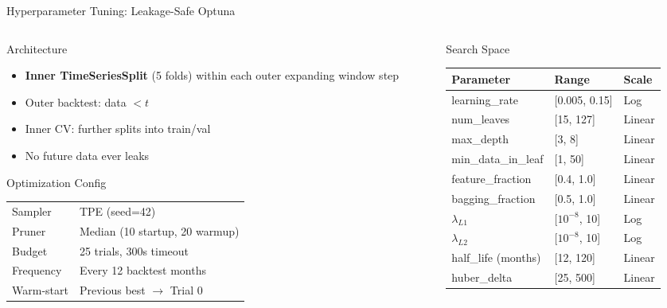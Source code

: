 \documentclass[aspectratio=169,10pt]{beamer}
\begin{document}
\begin{frame}{Hyperparameter Tuning: Leakage-Safe Optuna}
\begin{columns}[T]
\begin{column}{0.48\textwidth}
\begin{block}{Architecture}
\footnotesize
\begin{itemize}
  \item \textbf{Inner TimeSeriesSplit} (5 folds) within each outer expanding window step
  \item Outer backtest: data $< t$
  \item Inner CV: further splits into train/val
  \item No future data ever leaks
\end{itemize}
\end{block}

\begin{block}{Optimization Config}
\scriptsize
\begin{tabular}{@{}ll@{}}
\toprule
Sampler & TPE (seed=42) \\
Pruner & Median (10 startup, 20 warmup) \\
Budget & 25 trials, 300s timeout \\
Frequency & Every 12 backtest months \\
Warm-start & Previous best $\to$ Trial 0 \\
\bottomrule
\end{tabular}
\end{block}
\end{column}
\begin{column}{0.48\textwidth}
\begin{block}{Search Space}
\scriptsize
\begin{tabular}{@{}lll@{}}
\toprule
\textbf{Parameter} & \textbf{Range} & \textbf{Scale} \\
\midrule
learning\_rate & [0.005, 0.15] & Log \\
num\_leaves & [15, 127] & Linear \\
max\_depth & [3, 8] & Linear \\
min\_data\_in\_leaf & [1, 50] & Linear \\
feature\_fraction & [0.4, 1.0] & Linear \\
bagging\_fraction & [0.5, 1.0] & Linear \\
$\lambda_{L1}$ & [$10^{-8}$, 10] & Log \\
$\lambda_{L2}$ & [$10^{-8}$, 10] & Log \\
half\_life (months) & [12, 120] & Linear \\
huber\_delta & [25, 500] & Linear \\
\bottomrule
\end{tabular}
\end{block}
\end{column}
\end{columns}
\end{frame}
\end{document}
